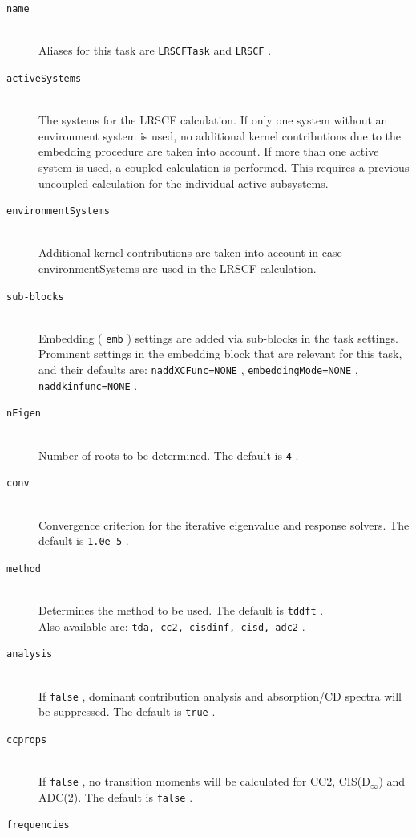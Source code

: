 \documentclass[bibliography=totocnumbered,a4paper,10pt,oneside]{scrbook}
\newcommand{\ttt}[1]{%
  \begingroup\setlength{\fboxsep}{1pt}%
  \colorbox{serenity-green!30}{\texttt{\hspace*{2pt}\vphantom{(g}#1\hspace*{2pt}}}%
  \endgroup
}
\begin{document}
\begin{description}
    \item [\texttt{name}]\hfill \\
    Aliases for this task are \ttt{LRSCFTask} and \ttt{LRSCF}.
    \item [\texttt{activeSystems}]\hfill \\
    The systems for the LRSCF calculation. If only one system without an environment system is used, no additional kernel contributions due to the embedding procedure are taken into account. If more than one active system is used, a coupled calculation is performed. This requires a previous uncoupled calculation for the individual active subsystems.
    \item [\texttt{environmentSystems}]\hfill \\
    Additional kernel contributions are taken into account in case environmentSystems are used in the LRSCF calculation.
    \item [\texttt{sub-blocks}]\hfill \\
    Embedding (\ttt{emb}) settings are added via sub-blocks in the task settings.
    Prominent settings in the embedding block that are relevant for this task, and their defaults are:
    \ttt{naddXCFunc=NONE}, \ttt{embeddingMode=NONE}, \ttt{naddkinfunc=NONE}.
    \item [\texttt{nEigen}]\hfill \\
    Number of roots to be determined. The default is \ttt{4}.
    \item [\texttt{conv}]\hfill \\
    Convergence criterion for the iterative eigenvalue and response solvers. The default is \ttt{1.0e-5}.
    \item [\texttt{method}]\hfill \\
    Determines the method to be used. The default is \ttt{tddft}. \\ Also available are: \ttt{tda, cc2, cisdinf, cisd, adc2}.
    \item [\texttt{analysis}]\hfill \\
    If \ttt{false}, dominant contribution analysis and absorption/CD spectra will be suppressed. The default is \ttt{true}.
    \item [\texttt{ccprops}]\hfill \\
    If \ttt{false}, no transition moments will be calculated for CC2, CIS(D$_\infty$) and ADC(2). The default is \ttt{false}.
    \item [\texttt{frequencies}]\hfill \\

\end{description}
\end{document}
